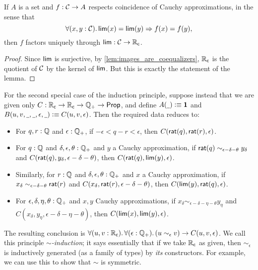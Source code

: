 % 

\begin{lem} \label{RC-lim-factor}
  If $A$ is a set and $f : \mathcal{C} \to A$ respects coincidence of Cauchy approximations, in the sense that
  \begin{equation*}
    \fall{x, y : \CAP} \rclim(x) = \rclim(y) \Rightarrow f(x) = f(y),
  \end{equation*}
  then $f$ factors uniquely through $\mathsf{lim} : \mathcal{C} \to \mathbb{R}_\mathsf{c}$.
\end{lem}
\begin{proof}
  Since $\mathsf{lim}$ is surjective, by \autoref{lem:images_are_coequalizers}, $\mathbb{R}_\mathsf{c}$ is the quotient of $\mathcal{C}$ by the kernel of $\mathsf{lim}$.
  But this is exactly the statement of the lemma.
\end{proof}

For the second special case of the induction principle, suppose instead that we are given only $C:\mathbb{R}_\mathsf{c}\to\mathbb{R}_\mathsf{c}\to\mathbb{Q}_{+}\to\mathsf{Prop}$, and define $A(\mathord{\underline{\hspace{1ex}}})\vcentcolon\equiv\mathbf{1}$ and $B(u,v,\mathord{\underline{\hspace{1ex}}},\mathord{\underline{\hspace{1ex}}},\epsilon,\mathord{\underline{\hspace{1ex}}})\vcentcolon\equiv C(u,v,\epsilon)$.
Then the required data reduces to:
\begin{itemize}
\item For $q,r:\mathbb{Q}$ and $\epsilon:\mathbb{Q}_{+}$, if $-\epsilon < q - r < \epsilon$, then $C(\mathsf{rat}(q),\mathsf{rat}(r),\epsilon)$.
\item For $q:\mathbb{Q}$ and $\delta,\epsilon,\theta:\mathbb{Q}_{+}$ and $y$ a Cauchy approximation, if $\mathsf{rat}(q) \sim_{\epsilon - \delta - \theta} y_\delta$ and
  $C(\mathsf{rat}(q),y_\delta,\epsilon-\delta-\theta)$,
  then $C(\mathsf{rat}(q),\mathsf{lim}(y),\epsilon)$.
\item Similarly, for $r:\mathbb{Q}$ and $\delta,\epsilon,\theta:\mathbb{Q}_{+}$ and $x$ a Cauchy approximation, if $x_\delta \sim_{\epsilon - \delta - \theta} \mathsf{rat}(r)$ and
  $C(x_\delta,\mathsf{rat}(r),\epsilon-\delta-\theta)$,
  then $C(\mathsf{lim}(y),\mathsf{rat}(q),\epsilon)$.
\item For $\epsilon,\delta,\eta,\theta:\mathbb{Q}_{+}$ and $x,y$ Cauchy approximations, if $x_\delta \sim_{\epsilon - \delta - \eta - \theta} y_\eta$ and
  $C(x_\delta,y_\eta,{\epsilon - \delta - \eta - \theta})$,
  then $C(\mathsf{lim}(x),\mathsf{lim}(y),\epsilon)$.
\end{itemize}
The resulting conclusion is $\fall{u,v:\RC}{\epsilon:\Qp} (u\sim_\epsilon v) \to C(u,v,\epsilon)$.
We call this principle \emph{$\sim$-induction}; it says essentially that if we take $\mathbb{R}_\mathsf{c}$ as given, then $\sim_\epsilon$ is inductively generated (as a family of types) by \emph{its} constructors.
For example, we can use this to show that $\sim$ is symmetric.

